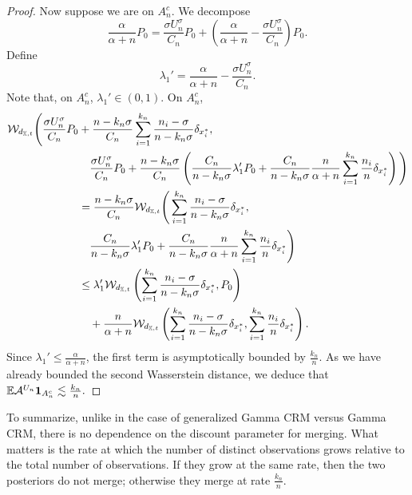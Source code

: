 \begin{proof}
    Now suppose we are on $A_n^c$. We decompose
    \[
    \frac{\alpha}{\alpha + n}P_0 = \frac{ \sigma U_n^\sigma}{C_n}P_0 + \left( \frac{\alpha}{\alpha + n}- \frac{ \sigma U_n^\sigma}{C_n}\right) P_0.
    \]
    Define
    \[
    \lambda_1' = \frac{\alpha}{\alpha + n} - \frac{\sigma U_n^\sigma}{C_n}.
    \]
    Note that, on $A_n^c$, $\lambda_1' \in (0,1)$. On $A_n^c$,
    \begin{align*}
        \mathcal{W}_{d_{\mathbb{X},t}} \Bigg( \frac{ \sigma U_n^\sigma}{C_n}P_0 & + \frac{n - k_n\sigma}{C_n}\sum_{i = 1}^{k_n}\frac{n_i - \sigma}{n - k_n\sigma}\delta_{x_i^*}, \\
        & \quad \frac{ \sigma U_n^\sigma}{C_n}P_0 + \frac{n - k_n\sigma}{C_n}\left( \frac{C_n}{n - k_n\sigma}\lambda_1'P_0 + \frac{C_n}{n-k_n\sigma}\frac{n}{\alpha + n}\sum_{i = 1}^{k_n}\frac{n_i}{n}\delta_{x_i^*}\right) \Bigg) \\
        & = \frac{n - k_n\sigma}{C_n}\mathcal{W}_{d_{\mathbb{X},t}} \Bigg( \sum_{i = 1}^{k_n}\frac{n_i - \sigma}{n - k_n\sigma}\delta_{x_i^*},\\
        & \quad \frac{C_n}{n - k_n\sigma}\lambda_1'P_0 + \frac{C_n}{n - k_n\sigma}\frac{n}{\alpha + n}\sum_{i = 1}^{k_n}\frac{n_i}{n}\delta_{x_i^*}\Bigg) \\
        & \leq \lambda_1'\mathcal{W}_{d_{\mathbb{X},t}}\left( \sum_{i = 1}^{k_n}\frac{n_i - \sigma}{n - k_n\sigma}\delta_{x_i^*}, P_0\right)\\ 
        &\quad + \frac{n}{\alpha + n}\mathcal{W}_{d_{\mathbb{X},t}} \left(\sum_{i = 1}^{k_n}\frac{n_i - \sigma}{n - k_n \sigma}\delta_{x_i^*}, \sum_{i = 1}^{k_n}\frac{n_i}{n}\delta_{x_i^*} \right).
    \end{align*}
    Since $\lambda_1' \leq \frac{\alpha}{\alpha + n}$, the first term is asymptotically bounded by $\frac{k_n}{n}$. As we have already bounded the second Wasserstein distance, we deduce that $\mathbb{E} \mathcal{A}^{U_n} \mathbf{1}_{A_n^c} \lesssim \frac{k_n}{n}.$
\end{proof}
To summarize, unlike in the case of generalized Gamma CRM versus Gamma CRM, there is no dependence on the discount parameter for merging. What matters is the rate at which the number of distinct observations grows relative to the total number of observations. If they grow at the same rate, then the two posteriors do not merge; otherwise they merge at rate $\frac{k_n}{n}.$